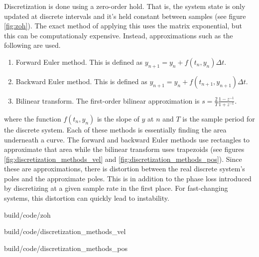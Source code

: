 Discretization is done using a zero-order hold. That is, the system state is
only updated at discrete intervals and it's held constant between samples (see
figure \ref{fig:zoh}). The exact method of applying this uses the matrix
exponential, but this can be computationaly expensive. Instead, approximations
such as the following are used.

\begin{enumerate}
  \item Forward Euler method. This is defined as
    $y_{n+1} = y_n + f(t_n, y_n) \Delta t$.
  \item Backward Euler method. This is defined as
    $y_{n+1} = y_n + f(t_{n+1}, y_{n+1}) \Delta t$.
  \item Bilinear transform. The first-order bilinear approximation is
    $s = \frac{2}{T} \frac{1 - z^{-1}}{1 + z^{-1}}$.
\end{enumerate}

where the function $f(t_n, y_n)$ is the slope of $y$ at $n$ and $T$ is the
sample period for the discrete system. Each of these methods is essentially
finding the area underneath a curve. The forward and backward Euler methods use
rectangles to approximate that area while the bilinear transform uses
trapezoids (see figures \ref{fig:discretization_methods_vel} and
\ref{fig:discretization_methods_pos}). Since these are approximations, there is
distortion between the real discrete system's poles and the approximate poles.
This is in addition to the phase loss introduced by discretizing at a given
sample rate in the first place. For fast-changing systems, this distortion can
quickly lead to instability.

\begin{svg}{build/code/zoh}
    \caption{Zero-order hold of a system response}
    \label{fig:zoh}
\end{svg}

\begin{svg}{build/code/discretization_methods_vel}
  \caption{Discretization methods applied to velocity data}
  \label{fig:discretization_methods_vel}
\end{svg}

\begin{svg}{build/code/discretization_methods_pos}
  \caption{Position plot of discretization methods applied to velocity data}
  \label{fig:discretization_methods_pos}
\end{svg}

